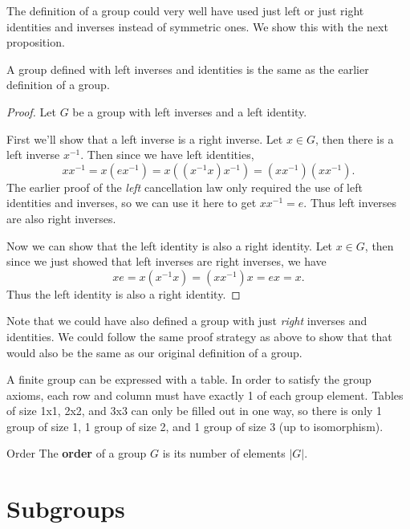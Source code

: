 \documentclass[10pt]{report}
\begin{document}
\begin{note}{}{}
	The definition of a group could very well have used just left or just right identities and inverses instead of symmetric ones. We show this with the next proposition.
\end{note}

\begin{prop}
	A group defined with left inverses and identities is the same as the earlier definition of a group.
\end{prop}
\begin{proof}
	Let $G$ be a group with left inverses and a left identity.

	First we'll show that a left inverse is a right inverse. Let $x \in G$, then there is a left inverse $x^{-1}$. Then since we have left identities,
	\[
		x x^{-1} = x (e x^{-1}) = x ( (x^{-1} x) x^{-1}) = (x x^{-1}) (x x^{-1}).
	\] 
	The earlier proof of the \textit{left} cancellation law only required the use of left identities and inverses, so we can use it here to get $x x^{-1} = e.$ Thus left inverses are also right inverses.

	Now we can show that the left identity is also a right identity. Let $x \in G$, then since we just showed that left inverses are right inverses, we have
	\[
		x e = x (x^{-1} x) = (x x^{-1}) x = e x = x.
	\] Thus the left identity is also a right identity.
\end{proof}

Note that we could have also defined a group with just \textit{right} inverses and identities. We could follow the same proof strategy as above to show that that would also be the same as our original definition of a group.

\begin{note}{}{}
A finite group can be expressed with a table. In order to satisfy the group axioms, each row and column must have exactly 1 of each group element. Tables of size 1x1, 2x2, and 3x3 can only be filled out in one way, so there is only 1 group of size 1, 1 group of size 2, and 1 group of size 3 (up to isomorphism).
\end{note}

\begin{defn}{Order}{}
The \textbf{order} of a group $G$ is its number of elements $|G|$.
\end{defn}


\section{Subgroups}
\end{document}
